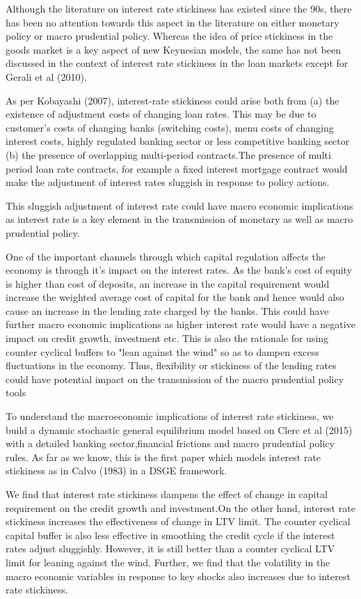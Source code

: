 \documentclass[12pt]{article}
\numberwithin{equation}{section}
\begin{document}
Although the literature on interest rate stickiness has existed since the 90s, there has been no attention towards this aspect in the literature on either monetary policy or macro prudential policy. Whereas the idea of price stickiness in the goods market is a key aspect of new Keynesian models, the same has not been discussed in the context of interest rate stickiness in the loan markets except for Gerali et al (2010).

As per Kobayashi (2007), interest-rate stickiness could arise  both from (a) the existence of adjustment costs of changing loan rates. This may be due to customer's costs of changing banks (switching costs), menu costs of changing interest costs, highly regulated banking sector or less competitive banking sector (b) the presence of overlapping multi-period contracts.The presence of multi period loan rate contracts, for example a fixed interest mortgage contract would make the adjustment of interest rates sluggish in response to policy actions.

This sluggish adjustment of interest rate could have macro economic implications as interest rate is a key element in the transmission of monetary as well as macro prudential policy.

One of the important channels through which capital regulation affects the economy is through it's impact on the interest rates. As the bank's cost of equity is higher than cost of deposits, an increase in the capital requirement would increase the weighted average cost of capital for the bank and hence would also cause an increase in the lending rate charged by the banks. This could have further macro economic implications as higher interest rate would have a negative impact on credit growth, investment etc. This is also the rationale for using counter cyclical buffers to "lean against the wind" so as to dampen excess fluctuations in the economy.
Thus, flexibility or stickiness of the lending rates could have potential impact on the transmission of the macro prudential policy tools

To understand the macroeconomic implications of interest rate stickiness, we build a dynamic stochastic general equilibrium model based on Clerc et al (2015) with a detailed banking sector,financial frictions and macro prudential policy rules. As far as we know, this is the first paper which models interest rate stickiness as in Calvo (1983) in a DSGE framework.

We find that interest rate stickiness dampens the effect of change in capital requirement on the credit growth and investment.On the other hand, interest rate stickiness increases the effectiveness of change in LTV limit. The counter cyclical capital buffer is also less effective in smoothing the credit cycle if the interest rates adjust sluggishly. However, it is still better than a counter cyclical LTV limit for leaning against the wind. Further, we  find that the volatility in the macro economic variables in response to key shocks also increases due to interest rate stickiness.
\end{document}

